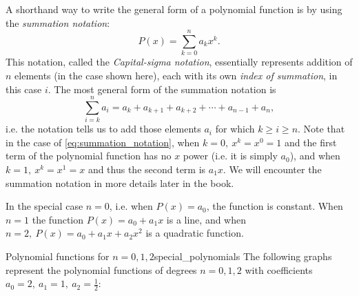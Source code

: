 A shorthand way to write the general form of a polynomial function is by using the \emph{summation notation}:
\begin{equation}
	P(x) = \sum\limits_{k=0}^{n}a_{k}x^{k}.
	\label{eq:summation_notation}
\end{equation}
This notation, called the \emph{Capital-sigma notation}, essentially represents addition of $n$ elements (in the case shown here), each with its own \emph{index of summation}, in this case $i$. The most general form of the summation notation is
\begin{equation}
	\sum\limits_{i=k}^{n}a_{i} = a_{k} + a_{k+1} + a_{k+2} + \cdots + a_{n-1} + a_{n},
	\label{eq:summation_notation_general}
\end{equation}
i.e. the notation tells us to add those elements $a_{i}$ for which $k\geq i\geq n$. Note that in the case of \autoref{eq:summation_notation}, when $k=0,\ x^{k}=x^{0}=1$ and the first term of the polynomial function has no $x$ power (i.e. it is simply $a_{0}$), and when $k=1,\ x^{k}=x^{1}=x$ and thus the second term is $a_{1}x$. We will encounter the summation notation in more details later in the book.

In the special case $n=0$, i.e. when $P(x)=a_{0}$, the function is constant. When $n=1$ the function $P(x)=a_{0}+a_{1}x$ is a line, and when $n=2,\ P(x)=a_{0}+a_{1}x+a_{2}x^{2}$ is a quadratic function.

\begin{example}{Polynomial functions for $n=0,1,2$}{special_polynomials}
	The following graphs represent the polynomial functions of degrees $n=0,1,2$ with coefficients $a_{0}=2,\ a_{1}=1,\ a_{2}=\frac{1}{2}$:

	\begin{figure}[H]
		\centering
	\end{figure}
\end{example}

